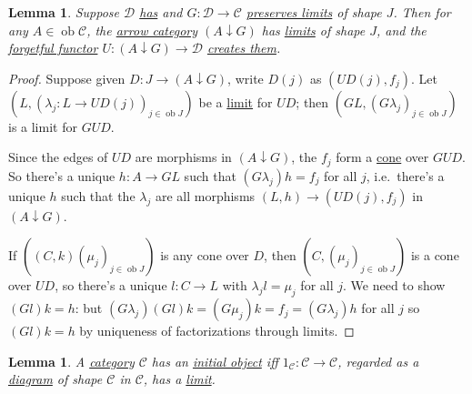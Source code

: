 \documentclass{article}
\DeclareMathOperator{\ob}{ob}
\let\to\longrightarrow
\newtheorem{nlemma}[nthm]{Lemma}
\begin{document}
\begin{nlemma}\label{lem:4.10}
  Suppose $\mathscr{D}$ \hyperlink{def:haslimits}{has} and $G: \mathscr{D} \to \mathscr{C}$ \hyperlink{def:plim}{preserves limits} of shape $J$.
  Then for any $A \in \ob \mathscr{C}$, the \hyperlink{def:comma}{arrow category} $(A \downarrow G)$ has \hyperlink{def:limit}{limits} of shape $J$, and the \hyperlink{def:forgFunc}{forgetful functor} $U: (A \downarrow G) \to \mathscr{D}$ \hyperlink{def:clim}{creates them}.
\end{nlemma}
\begin{proof}
  Suppose given $D : J \to (A \downarrow G)$, write $D(j)$ as $(U D(j), f_j)$.
  Let $(L, (\lambda_j: L \to U D(j))_{j \in \ob J})$ be a \hyperlink{def:limit}{limit} for $UD$;
  then $(GL, (G\lambda_j)_{j \in \ob J})$ is a limit for $GUD$.

  Since the edges of $UD$ are morphisms in $(A \downarrow G)$, the $f_j$ form a \hyperlink{def:cone}{cone} over $GUD$.
  So there's a unique $h: A \to GL$ such that $(G\lambda_j) h = f_j$ for all $j$,
  i.e.\ there's a unique $h$ such that the $\lambda_j$ are all morphisms $(L,h) \to (UD(j), f_j)$ in $(A \downarrow G)$.

  If $((C, k) (\mu_j)_{j \in \ob J})$ is any cone over $D$, then $(C, (\mu_j)_{j \in \ob J})$ is a cone over $UD$, so there's a unique $l: C \to L$ with $\lambda_j l = \mu_j$ for all $j$.
  We need to show $(Gl)k = h$:
  but $(G\lambda_j) (Gl) k = (G\mu_j) k = f_j = (G\lambda_j) h$
  for all $j$ so $(Gl)k = h$ by uniqueness of factorizations through limits.
\end{proof}
\begin{nlemma}\label{lem:4.11}
  A \hyperlink{def:cat}{category} $\mathscr{C}$ has an \hyperlink{def:initial}{initial object} iff $1_\mathscr{C}: \mathscr{C} \to \mathscr{C}$, regarded as a \hyperlink{def:diagram}{diagram} of shape $\mathscr{C}$ in $\mathscr{C}$, has a \hyperlink{def:limit}{limit}.
\end{nlemma}
\end{document}
